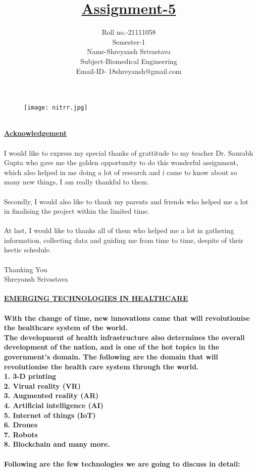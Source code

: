\documentclass[12pt]{article}
\title{\textbf{\underline{Assignment-5}}}
\date{Roll no.-21111058\\Semester-1\\\Large {Name-Shreyansh Srivastava}\\Subject-Biomedical Engineering\\Email-ID- 18shreyansh@gmail.com}
\begin{document}
	\maketitle
	\begin{figure}[h]
		\centering
		\texttt{[image: nitrr.jpg]}
	\end{figure}
	\clearpage
	\begin{Acknowledgement}
		\\\Huge{\textbf{\underline{Acknowledgement}}}\\
		\\\large I would like to express my special thanks of grattitude to my teacher Dr. Saurabh Gupta who gave me the golden opportunity to do this wonderful assignment, which also helped in me doing a lot of research and i came to know about so many new things, I am really thankful to them.\\\\
		Secondly, I would also like to thank my parents and friends who helped me a lot in finalising the project within the limited time.\\\\
		At last, I would like to thanks all of them who helped me a lot in gathering information, collecting data and guiding me from time to time, despite of their hectic schedule.\\\\
		Thanking You\\
		Shreyansh Srivastava
	\end{Acknowledgement}
	\clearpage
	\paragraph{\textbf{\underline{\Large EMERGING TECHNOLOGIES IN HEALTHCARE}}
	\\\\With the change of time, new innovations came that will revolutionise the healthcare system of the world. 
    \\The development of health infrastructure also determines the overall development of the nation, and is one of the hot topics in the government's domain. The following are the domain that will revolutionise the health care system through the world.
    \\1. 3-D printing
    \\2. Virual reality (VR)
    \\3. Augmented reality (AR)
    \\4. Artificial intelligence (AI)
    \\5. Internet of things (IoT)
    \\6. Drones
    \\7. Robots
    \\8. Blockchain and many more.
    \\\\Following are the few technologies we are going to discuss in detail:}
\end{document}
